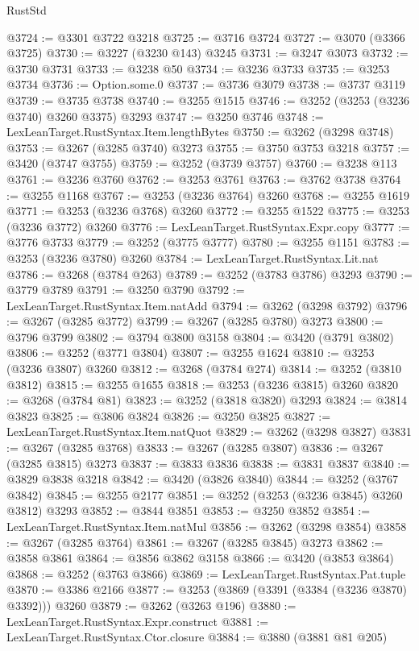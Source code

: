 \begin{lexlean}{RustStd}
\begin{coremodule}
@3724 := @3301 @3722 @3218
@3725 := @3716 @3724
@3727 := @3070 (@3366 @3725)
@3730 := @3227 (@3230 @143) @3245
@3731 := @3247 @3073
@3732 := @3730 @3731
@3733 := @3238 @50
@3734 := @3236 @3733
@3735 := @3253 @3734
@3736 := Option.some.{0}
@3737 := @3736 @3079
@3738 := @3737 @3119
@3739 := @3735 @3738
@3740 := @3255 @1515
@3746 := @3252 (@3253 (@3236 @3740) @3260 @3375) @3293
@3747 := @3250 @3746
@3748 := LexLeanTarget.RustSyntax.Item.lengthBytes
@3750 := @3262 (@3298 @3748)
@3753 := @3267 (@3285 @3740) @3273
@3755 := @3750 @3753 @3218
@3757 := @3420 (@3747 @3755)
@3759 := @3252 (@3739 @3757)
@3760 := @3238 @113
@3761 := @3236 @3760
@3762 := @3253 @3761
@3763 := @3762 @3738
@3764 := @3255 @1168
@3767 := @3253 (@3236 @3764) @3260
@3768 := @3255 @1619
@3771 := @3253 (@3236 @3768) @3260
@3772 := @3255 @1522
@3775 := @3253 (@3236 @3772) @3260
@3776 := LexLeanTarget.RustSyntax.Expr.copy
@3777 := @3776 @3733
@3779 := @3252 (@3775 @3777)
@3780 := @3255 @1151
@3783 := @3253 (@3236 @3780) @3260
@3784 := LexLeanTarget.RustSyntax.Lit.nat
@3786 := @3268 (@3784 @263)
@3789 := @3252 (@3783 @3786) @3293
@3790 := @3779 @3789
@3791 := @3250 @3790
@3792 := LexLeanTarget.RustSyntax.Item.natAdd
@3794 := @3262 (@3298 @3792)
@3796 := @3267 (@3285 @3772)
@3799 := @3267 (@3285 @3780) @3273
@3800 := @3796 @3799
@3802 := @3794 @3800 @3158
@3804 := @3420 (@3791 @3802)
@3806 := @3252 (@3771 @3804)
@3807 := @3255 @1624
@3810 := @3253 (@3236 @3807) @3260
@3812 := @3268 (@3784 @274)
@3814 := @3252 (@3810 @3812)
@3815 := @3255 @1655
@3818 := @3253 (@3236 @3815) @3260
@3820 := @3268 (@3784 @81)
@3823 := @3252 (@3818 @3820) @3293
@3824 := @3814 @3823
@3825 := @3806 @3824
@3826 := @3250 @3825
@3827 := LexLeanTarget.RustSyntax.Item.natQuot
@3829 := @3262 (@3298 @3827)
@3831 := @3267 (@3285 @3768)
@3833 := @3267 (@3285 @3807)
@3836 := @3267 (@3285 @3815) @3273
@3837 := @3833 @3836
@3838 := @3831 @3837
@3840 := @3829 @3838 @3218
@3842 := @3420 (@3826 @3840)
@3844 := @3252 (@3767 @3842)
@3845 := @3255 @2177
@3851 := @3252 (@3253 (@3236 @3845) @3260 @3812) @3293
@3852 := @3844 @3851
@3853 := @3250 @3852
@3854 := LexLeanTarget.RustSyntax.Item.natMul
@3856 := @3262 (@3298 @3854)
@3858 := @3267 (@3285 @3764)
@3861 := @3267 (@3285 @3845) @3273
@3862 := @3858 @3861
@3864 := @3856 @3862 @3158
@3866 := @3420 (@3853 @3864)
@3868 := @3252 (@3763 @3866)
@3869 := LexLeanTarget.RustSyntax.Pat.tuple
@3870 := @3386 @2166
@3877 := @3253 (@3869 (@3391 (@3384 (@3236 @3870) @3392))) @3260
@3879 := @3262 (@3263 @196)
@3880 := LexLeanTarget.RustSyntax.Expr.construct
@3881 := LexLeanTarget.RustSyntax.Ctor.closure
@3884 := @3880 (@3881 @81 @205)

\end{coremodule}
\end{lexlean}
